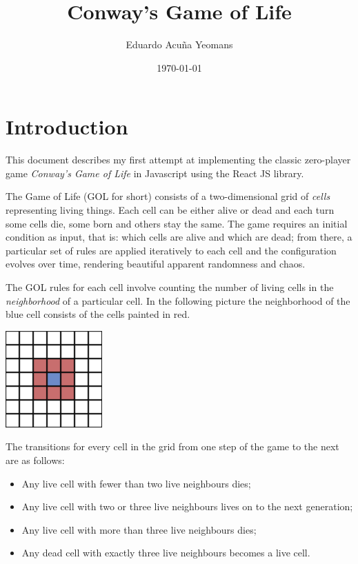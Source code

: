 \documentclass[11pt]{article}
\author{Eduardo Acuña Yeomans}
\date{\today}
\title{Conway's Game of Life}
\begin{document}
\maketitle
\tableofcontents


\section{Introduction}
\label{sec:org0d3fb80}

This document describes my first attempt at implementing the classic zero-player game \emph{Conway's Game of Life} in Javascript using the React JS library.

The Game of Life (GOL for short) consists of a two-dimensional grid of \emph{cells} representing living things. Each cell can be either alive or dead and each turn some cells die, some born and others stay the same. The game requires an initial condition as input, that is: which cells are alive and which are dead; from there, a particular set of rules are applied iteratively to each cell and the configuration evolves over time, rendering beautiful apparent randomness and chaos.

The GOL rules for each cell involve counting the number of living cells in the \emph{neighborhood} of a particular cell. In the following picture the neighborhood of the blue cell consists of the cells painted in red.

\begin{center}
\includegraphics[width=10em]{./img/neighbors.png}
\label{org9c2764e}
\end{center}

The transitions for every cell in the grid from one step of the game to the next are as follows:
\begin{itemize}
\item Any live cell with fewer than two live neighbours dies;
\item Any live cell with two or three live neighbours lives on to the next generation;
\item Any live cell with more than three live neighbours dies;
\item Any dead cell with exactly three live neighbours becomes a live cell.
\end{itemize}
\end{document}
